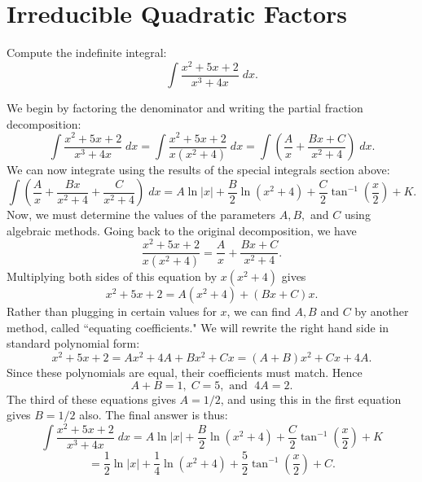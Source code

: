 \documentclass{ximera}
\begin{document}
\begin{center}
\begin{foldable}
\end{foldable}
\end{center}

\section{Irreducible Quadratic Factors}

\begin{example}
Compute the indefinite integral:
\[
\int \frac{x^2 + 5x + 2}{x^3 + 4x} \; dx.
\]

We begin by factoring the denominator and writing the partial fraction decomposition:
\[
\int \frac{x^2 + 5x + 2}{x^3 + 4x} \; dx = \int \frac{x^2 + 5x + 2}{x(x^2 + 4)} \; dx = \int \left(\frac{A}{x} + \frac{Bx+C}{x^2+4} \right) \; dx.
\]
We can now integrate using the results of the special integrals section above:
\[
\int \left(\frac{A}{x} + \frac{Bx}{x^2+4} + \frac{C}{x^2+4} \right) \; dx = A\ln|x| + \frac{B}{2}\ln(x^2 +4 ) + \frac{C}{2}\tan^{-1}\left(\frac{x}{2}\right) + K.
\]
Now, we must determine the values of the parameters $A, B, $ and $C$ using algebraic methods.
Going back to the original decomposition, we have
\[
\frac{x^2 + 5x + 2}{x(x^2 + 4)} = \frac{A}{x} + \frac{Bx+C}{x^2+4}.
\]
Multiplying both sides of this equation by $x(x^2 +4)$ gives
\[
x^2 + 5x + 2 = A(x^2 +4)+ (Bx + C)x.
\]
Rather than plugging in certain values for $x$, we can find $A, B$ and $C$ by another method, called ``equating coefficients."
We will rewrite the right hand side in standard polynomial form:
\[
x^2 + 5x + 2 = Ax^2 + 4A + Bx^2 + Cx = (A+B)x^2 + Cx + 4A.
\]
Since these polynomials are equal, their coefficients must match.  Hence
\[
A+B = 1,\; C = 5, \text { and } \; 4A = 2.
\]
The third of these equations gives $A = 1/2$, and using this in the first equation gives $B = 1/2$ also.
The final answer is thus:
\[
\int \frac{x^2 + 5x + 2}{x^3 + 4x} \; dx = A\ln|x| + \frac{B}{2}\ln(x^2 +4 ) + \frac{C}{2}\tan^{-1}\left(\frac{x}{2}\right) + K
\]
\[
= \frac12\ln|x| + \frac{1}{4}\ln(x^2 +4 ) + \frac{5}{2}\tan^{-1}\left(\frac{x}{2}\right) + C.
\]




\end{example}



\begin{center}
\begin{foldable}
\end{foldable}
\end{center}
\end{document}

